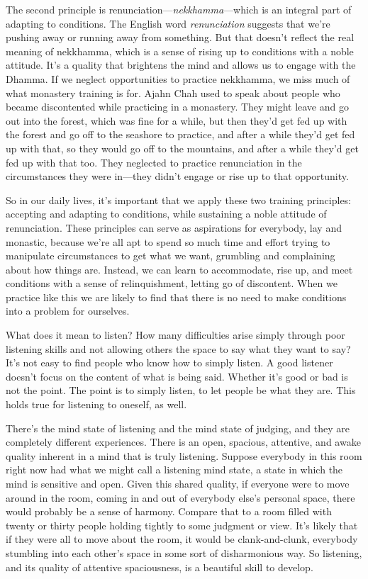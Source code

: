 The second principle is renunciation---\emph{nekkhamma}---which is an
integral part of adapting to conditions. The English word
\emph{renunciation} suggests that we're pushing away or running away
from something. But that doesn't reflect the real meaning of nekkhamma,
which is a sense of rising up to conditions with a noble attitude. It's
a quality that brightens the mind and allows us to engage with the
Dhamma. If we neglect \mbox{opportunities} to practice nekkhamma, we
miss much of what monastery training is for. Ajahn Chah used to speak
about people who became discontented while practicing in a monastery.
They might leave and go out into the forest, which was fine for a while,
but then they'd get fed up with the forest and go off to the seashore to
practice, and after a while they'd get fed up with that, so they would
go off to the mountains, and after a while they'd get fed up with that
too. They neglected to practice renunciation in the circumstances they
were in---they didn't engage or rise up to that opportunity.

So in our daily lives, it's important that we apply these two training 
principles: accepting and adapting to conditions, while sustaining a 
noble attitude of renunciation. These principles can serve as 
aspirations for everybody, lay and monastic, because we're all apt to 
spend so much time and effort trying to manipulate circumstances to get 
what we want, grumbling and complaining about how things are. Instead, 
we can learn to accommodate, rise up, and meet conditions with a sense 
of relinquishment, letting go of discontent. When we practice like this 
we are likely to find that there is no need to make conditions into a 
problem for ourselves.


What does it mean to listen? How many difficulties arise simply through 
poor listening skills and not allowing others the space to say what 
they want to say? It's not easy to find people who know how to simply 
listen. A good listener doesn't focus on the content of what is being 
said. Whether it's good or bad is not the point. The point is to simply 
listen, to let people be what they are. This holds true for listening 
to oneself, as well.

There's the mind state of listening and the mind state of judging, and 
they are completely different experiences. There is an open, spacious, 
attentive, and awake quality inherent in a mind that is truly 
listening. Suppose everybody in this room right now had what we might 
call a listening mind state, a state in which the mind is sensitive and 
open. Given this shared quality, if everyone were to move around in the 
room, coming in and out of everybody else's personal space, there would 
probably be a sense of harmony. Compare that to a room filled with 
twenty or thirty people holding tightly to some judgment or view. It's 
likely that if they were all to move about the room, it would be 
clank-and-clunk, everybody stumbling into each other's space in some 
sort of disharmonious way. So listening, and its quality of attentive 
spaciousness, is a beautiful skill to develop.

